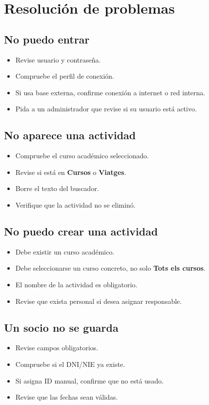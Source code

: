 \documentclass[12pt]{article}
\newcommand{\menu}[1]{\textbf{#1}}
\begin{document}
\section{Resolución de problemas}
\subsection{No puedo entrar}
\begin{itemize}
  \item Revise usuario y contraseña.
  \item Compruebe el perfil de conexión.
  \item Si usa base externa, confirme conexión a internet o red interna.
  \item Pida a un administrador que revise si su usuario está activo.
\end{itemize}

\subsection{No aparece una actividad}
\begin{itemize}
  \item Compruebe el curso académico seleccionado.
  \item Revise si está en \menu{Cursos} o \menu{Viatges}.
  \item Borre el texto del buscador.
  \item Verifique que la actividad no se eliminó.
\end{itemize}

\subsection{No puedo crear una actividad}
\begin{itemize}
  \item Debe existir un curso académico.
  \item Debe seleccionarse un curso concreto, no solo \menu{Tots els cursos}.
  \item El nombre de la actividad es obligatorio.
  \item Revise que exista personal si desea asignar responsable.
\end{itemize}

\subsection{Un socio no se guarda}
\begin{itemize}
  \item Revise campos obligatorios.
  \item Compruebe si el DNI/NIE ya existe.
  \item Si asigna ID manual, confirme que no está usado.
  \item Revise que las fechas sean válidas.
\end{itemize}
\end{document}
